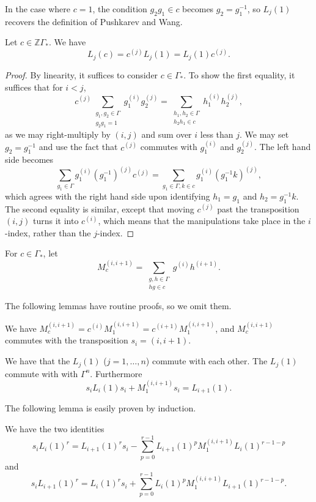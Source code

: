 In the case where $c = 1$, the condition $g_2g_1 \in c$ becomes $g_2 = g_1^{-1}$, so $L_j(1)$ recovers the definition of Pushkarev and Wang.
\begin{proposition}
Let $c \in \mathbb{Z}\Gamma_*$. We have
\[
L_j(c) = c^{(j)} L_j(1) = L_j(1) c^{(j)}.
\]
\end{proposition}
\begin{proof}
By linearity, it suffices to consider $c \in \Gamma_*$. To show the first equality, it suffices that for $i<j$,
\[
c^{(j)} \sum_{\substack{g_1, g_2 \in \Gamma \\ g_2g_1 = 1}} g_1^{(i)} g_2^{(j)} = \sum_{\substack{h_1, h_2 \in \Gamma \\ h_2h_1 \in c}} h_1^{(i)} h_2^{(j)},
\]
as we may right-multiply by $(i,j)$ and sum over $i$ less than $j$. We may set $g_2 = g_1^{-1}$ and use the fact that $c^{(j)}$ commutes with $g_1^{(i)}$ and $g_2^{(j)}$. The left hand side becomes
\[
\sum_{g_1 \in \Gamma} g_1^{(i)} (g_1^{-1})^{(j)} c^{(j)} = \sum_{g_1 \in \Gamma, k \in c} g_1^{(i)} (g_1^{-1} k)^{(j)},
\]
which agrees with the right hand side upon identifying $h_1 = g_1$ and $h_2 = g_1^{-1}k$. The second equality is similar, except that moving $c^{(j)}$ past the transposition $(i, j)$ turns it into $c^{(i)}$, which means that the manipulations take place in the $i$-index, rather than the $j$-index.
\end{proof}



\begin{definition}
For $c \in \Gamma_*$, let
\[
M_c^{(i,i+1)} = \sum_{\substack{g,h \in \Gamma \\ hg \in c}} g^{(i)}h^{(i+1)}.
\]
\end{definition}


The following lemmas have routine proofs, so we omit them.
\begin{lemma}
We have $M_c^{(i,i+1)} = c^{(i)} M_1^{(i,i+1)}  = c^{(i+1)} M_1^{(i,i+1)}$, and $M_c^{(i,i+1)}$ commutes with the transposition $s_i = (i, i+1)$.
\end{lemma}

\begin{lemma}
We have that the $L_j(1)$ \textup{(}$j=1,\ldots,n$\textup{)} commute with each other. 
The $L_j(1)$ commute with with $\Gamma^n$. Furthermore
\[
s_i L_i(1) s_i + M_1^{(i,i+1)} s_i = L_{i+1}(1).
\]
\end{lemma}

The following lemma is easily proven by induction.
\begin{lemma} \label{iterative_swap_lemma}
We have the two identities
\[
s_i L_i(1)^r = L_{i+1}(1)^r s_i - \sum_{p=0}^{r-1} L_{i+1}(1)^p M_1^{(i,i+1)} L_i(1)^{r-1-p}
\]
and
\[
s_i L_{i+1}(1)^r = L_{i}(1)^r s_i + \sum_{p=0}^{r-1} L_{i}(1)^p M_1^{(i,i+1)} L_{i+1}(1)^{r-1-p}.
\]
\end{lemma}

